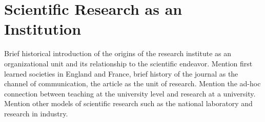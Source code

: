 \section{Scientific Research as an Institution}
Brief historical introduction of the origins of the research institute as an organizational unit and its relationship to the scientific endeavor. Mention first learned societies in England and France, brief history of the journal as the channel of communication, the article as the unit of research. Mention the ad-hoc connection between teaching at the university level and research at a university. Mention other models of scientific research such as the national laboratory and research in industry. 